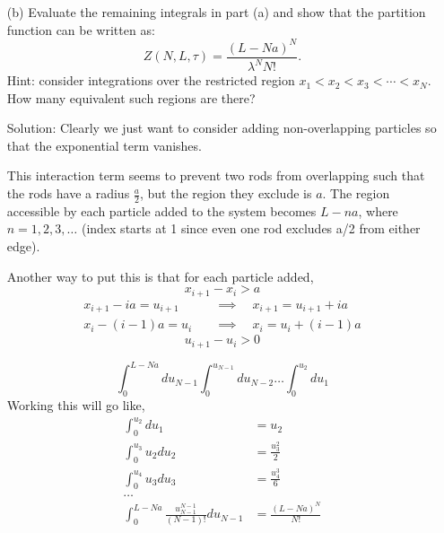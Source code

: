 \begin{homeworkProblem}
\begin{enumerate}
\begin{callout}{Solution:}
                Where I've implied that there is this interaction term acting over all particles as a spatial function. While working this problem I hadn't realized there was a term for this so I apologize if this is a bit sloppy.

            \end{callout}

        \item[(b)] Evaluate the remaining integrals in part (a) and show that the partition function can be written as:
            \[
                Z(N, L, \tau) = \frac{(L - Na)^N}{\lambda^N N!}.
            \]
            Hint: consider integrations over the restricted region $x_1 < x_2 < x_3 < \cdots < x_N$. How many equivalent
            such regions are there?
            \begin{callout}{Solution:}
                Clearly we just want to consider adding non-overlapping particles so that the exponential term vanishes.

                This interaction term seems to prevent two rods from overlapping such that the rods have a radius $\frac{a}{2}$, but the region they exclude is $a$. The region accessible by each particle added to the system becomes $L-na$, where $n=1,2,3,\dots$ (index starts at 1 since even one rod excludes a/2 from either edge).

                Another way to put this is that for each particle added, 
                $$x_{i+1}-x_i > a$$
                \begin{align*}
                    x_{i+1} - ia = u_{i+1} \quad &\implies \quad x_{i+1} = u_{i+1} + ia \\
                    x_i - (i - 1)a = u_i \quad &\implies \quad x_i = u_i + (i-1)a
                \end{align*}
                $$u_{i+1} - u_{i} > 0$$

                $$\int_{0}^{L-Na}du_{N-1} \int_{0}^{u_{N-1}}du_{N-2}\dots \int_{0}^{u_{2}}du_{1}$$
                Working this will go like,
                \begin{align*}
                    \int_{0}^{u_{2}} du_{1} &= u_{2} \\
                    \int_{0}^{u_{3}} u_{2} du_{2} &= \frac{u_{3}^{2}}{2} \\
                    \int_{0}^{u_{4}} u_{3} du_{3} &= \frac{u_{4}^{3}}{6} \\
                    \dots \\
                    \int_{0}^{L-Na} \frac{u_{N-1}^{N-1}}{(N-1)!} du_{N-1} &= \frac{\left( L-Na \right)^{N}}{N!}
                \end{align*}

            \end{callout}
    \end{enumerate}
\end{homeworkProblem}

